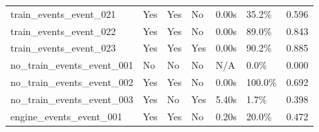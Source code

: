 \begin{table}[t]
\begin{tabular}{lllllll}
train\_events\_event\_021 & Yes & Yes & No & 0.00s & 35.2\% & 0.596 \\
train\_events\_event\_022 & Yes & Yes & No & 0.00s & 89.0\% & 0.843 \\
train\_events\_event\_023 & Yes & Yes & Yes & 0.00s & 90.2\% & 0.885 \\
no\_train\_events\_event\_001 & No & No & No & N/A & 0.0\% & 0.000 \\
no\_train\_events\_event\_002 & Yes & Yes & No & 0.00s & 100.0\% & 0.692 \\
no\_train\_events\_event\_003 & Yes & No & Yes & 5.40s & 1.7\% & 0.398 \\
engine\_events\_event\_001 & Yes & Yes & No & 0.20s & 20.0\% & 0.472 \\
\hline
\end{tabular}
\end{table}
